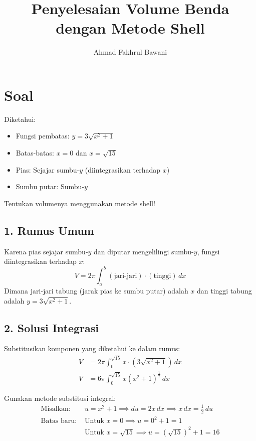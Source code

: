 \documentclass[12pt,a4paper]{article}
\title{Penyelesaian Volume Benda dengan Metode Shell}
\author{Ahmad Fakhrul Bawani}
\date{}
\begin{document}
\maketitle

\section*{Soal}

Diketahui:
\begin{itemize}
  \item Fungsi pembatas: $y = 3\sqrt{x^2 + 1}$
  \item Batas-batas: $x = 0$ dan $x = \sqrt{15}$
  \item Pias: Sejajar sumbu-$y$ (diintegrasikan terhadap $x$)
  \item Sumbu putar: Sumbu-$y$
\end{itemize}
Tentukan volumenya menggunakan metode shell!

\subsection*{1. Rumus Umum}
Karena pias sejajar sumbu-$y$ dan diputar mengelilingi sumbu-$y$, fungsi diintegrasikan terhadap $x$:
\begin{equation*}
  V = 2\pi \int_{a}^{b} (\text{jari-jari}) \cdot (\text{tinggi}) \, dx
\end{equation*}
Dimana jari-jari tabung (jarak pias ke sumbu putar) adalah $x$ dan tinggi tabung adalah $y = 3\sqrt{x^2 + 1}$.

\subsection*{2. Solusi Integrasi}
Substitusikan komponen yang diketahui ke dalam rumus:
\begin{align*}
  V &= 2\pi \int_{0}^{\sqrt{15}} x \cdot \left(3\sqrt{x^2 + 1}\right) \, dx \\
  V &= 6\pi \int_{0}^{\sqrt{15}} x(x^2 + 1)^{\frac{1}{2}} \, dx
\end{align*}

Gunakan metode substitusi integral:
\begin{align*}
  \text{Misalkan: } & u = x^2 + 1 \implies du = 2x \, dx \implies x \, dx = \frac{1}{2} \, du \\
  \text{Batas baru: } & \text{Untuk } x = 0 \implies u = 0^2 + 1 = 1 \\
  & \text{Untuk } x = \sqrt{15} \implies u = (\sqrt{15})^2 + 1 = 16
\end{align*}
\end{document}
